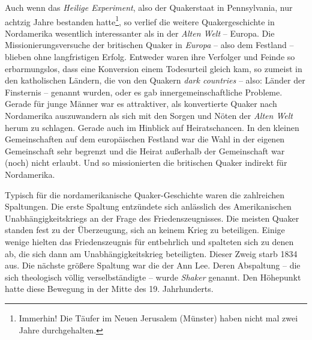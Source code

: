 \medskip

Auch wenn das \textit{Heilige Experiment}, also der Quakerstaat in Pennsylvania,
nur achtzig Jahre
bestanden hatte\footnote{Immerhin! Die Täufer im Neuen Jerusalem (Münster) haben
nicht mal zwei Jahre durchgehalten.}, so verlief die weitere
Quakergeschichte in Nordamerika wesentlich interessanter als in der
\textit{Alten
Welt} -- Europa. Die Missionierungsversuche der britischen
Quaker in
\textit{Europa} -- also dem Festland -- blieben ohne
langfristigen Erfolg.
Entweder waren ihre Verfolger und Feinde so erbarmungslos,
dass eine
Konversion einem Todesurteil gleich kam, so zumeist in den katholischen
Ländern, die von den Quakern \textit{dark countries} -- also: Länder der
Finsternis -- genannt wurden, oder es gab innergemeinschaftliche Probleme.
Gerade
für junge Männer war es attraktiver, als konvertierte Quaker nach Nordamerika
auszuwandern als sich mit den Sorgen und Nöten der \textit{Alten Welt} herum
zu
schlagen. Gerade auch im Hinblick auf Heiratschancen. In den
kleinen
Gemeinschaften auf dem europäischen Festland war die Wahl in der eigenen
Gemeinschaft sehr begrenzt und die Heirat außerhalb der Gemeinschaft war (noch)
nicht erlaubt. Und so missionierten die britischen Quaker indirekt für
Nordamerika.

\medskip

Typisch für die nordamerikanische Quaker-Geschichte waren die zahlreichen
Spaltungen. Die erste Spaltung entzündete sich anlässlich des
Amerikanischen
Unabhängigkeitskriegs an der Frage des Friedenszeugnisses. Die meisten Quaker
standen fest zu der Überzeugung, sich an keinem Krieg zu
beteiligen. Einige
wenige hielten das Friedenszeugnis für entbehrlich und spalteten sich zu denen ab,
die sich dann am Unabhängigkeitskrieg
beteiligten. Dieser Zweig starb 1834 aus. Die nächste größere Spaltung war die
der Ann Lee. Deren Abspaltung -- die sich theologisch
völlig verselbständigte --
wurde \textit{Shaker} genannt. Den Höhepunkt hatte
diese Bewegung in der Mitte
des 19. Jahrhunderts.

\medskip

